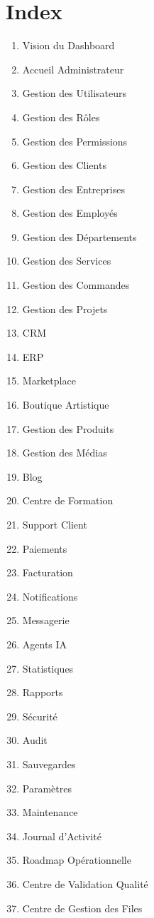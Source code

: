 \documentclass[12pt,a4paper,oneside]{book}
\begin{document}
\appendix

\chapter{Index}
\begin{enumerate}
\item Vision du Dashboard
\item Accueil Administrateur
\item Gestion des Utilisateurs
\item Gestion des Rôles
\item Gestion des Permissions
\item Gestion des Clients
\item Gestion des Entreprises
\item Gestion des Employés
\item Gestion des Départements
\item Gestion des Services
\item Gestion des Commandes
\item Gestion des Projets
\item CRM
\item ERP
\item Marketplace
\item Boutique Artistique
\item Gestion des Produits
\item Gestion des Médias
\item Blog
\item Centre de Formation
\item Support Client
\item Paiements
\item Facturation
\item Notifications
\item Messagerie
\item Agents IA
\item Statistiques
\item Rapports
\item Sécurité
\item Audit
\item Sauvegardes
\item Paramètres
\item Maintenance
\item Journal d'Activité
\item Roadmap Opérationnelle
\item Centre de Validation Qualité
\item Centre de Gestion des Files
\end{enumerate}
\end{document}

